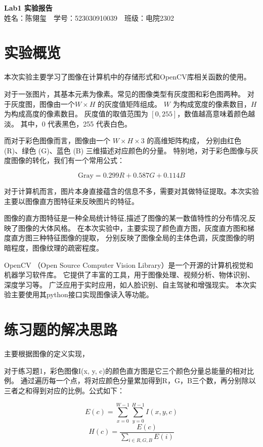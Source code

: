 \documentclass{article}
\begin{document}
\begin{center}
    \Large \textbf{Lab1 实验报告}\\
    \vspace{1em}
    姓名：陈翎玺~~学号：523030910039~~班级：电院2302
\end{center}

\section{实验概览}
    本次实验主要学习了图像在计算机中的存储形式和OpenCV库相关函数的使用。

    对于一张图片，其基本元素为像素。常见的图像类型有灰度图和彩色图两种。
    对于灰度图，图像由一个\( W \times H \) 的灰度值矩阵组成。
    \( W \) 为构成宽度的像素数目，\( H \) 为构成高度的像素数目。
    灰度值的取值范围为 \([0, 255]\)，数值越高意味着颜色越淡。
    其中，0 代表黑色，255 代表白色。

    而对于彩色图像而言，图像由一个 \( W \times H \times 3 \) 的高维矩阵构成，
    分别由红色 (R)、绿色 (G)、蓝色 (B) 三维描述对应颜色的分量。
    特别地，对于彩色图像与灰度图像的转化，我们有一个常用公式：

\[
\text{Gray} = 0.299R + 0.587G + 0.114B
\]

    对于计算机而言，图片本身直接蕴含的信息不多，需要对其做特征提取。本次实验主要以图像直方图特征来反映图片的特征。

    图像的直方图特征是一种全局统计特征,描述了图像的某一数值特性的分布情况,反映了图像的大体风格。
    在本次实验中，主要实现了颜色直方图，灰度直方图和梯度直方图三种特征图像的提取，
    分别反映了图像全局的主体色调，灰度图像的明暗程度，图像纹理的疏密程度。

    OpenCV （Open Source Computer Vision Library）是一个开源的计算机视觉和机器学习软件库。
    它提供了丰富的工具，用于图像处理、视频分析、物体识别、深度学习等。
    广泛应用于实时应用，如人脸识别、自主驾驶和增强现实。
    本次实验主要使用其python接口实现图像读入等功能。
    
\section{练习题的解决思路}
    主要根据图像的定义实现，

    对于练习题1，彩色图像I(x, y, c)的颜色直方图是它三个颜色分量总能量的相对比例。
    通过遍历每一个点，将对应颜色分量累加得到R，G，B三个数，再分别除以三者之和得到对应的比例。公式如下：

    \[E(c) = \sum_{x = 0}^{W - 1} \sum_{y = 0}^{H - 1}I(x, y, c) \]
    \[H(c) = \frac{E(c)}{\sum\limits_{i\in {R,G,B}}^{} E(i)}\]
\end{document}
